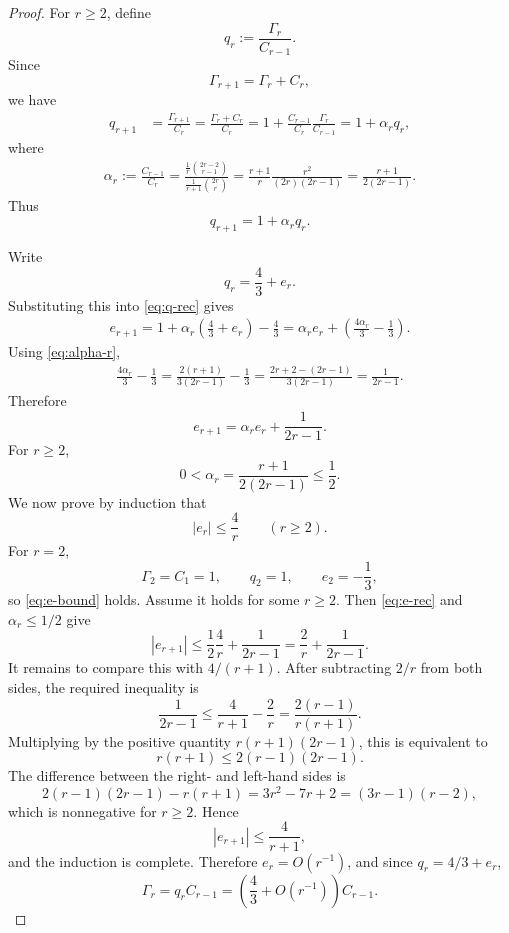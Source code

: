 \documentclass[10pt,a4paper]{amsart}
\theoremstyle{plain}
\begin{document}
\begin{proof}
For $r\ge2$, define
\[
 q_r:=\frac{\Gamma_r}{C_{r-1}}.
\]
Since
\[
 \Gamma_{r+1}=\Gamma_r+C_r,
\]
we have
\begin{align*}
 q_{r+1}
 &=\frac{\Gamma_{r+1}}{C_r}
 =\frac{\Gamma_r+C_r}{C_r}
 =1+\frac{C_{r-1}}{C_r}\frac{\Gamma_r}{C_{r-1}}=1+\alpha_r q_r,
\end{align*}
where
\begin{align}
 \alpha_r
 :=\frac{C_{r-1}}{C_r}
 =\frac{\frac1r\binom{2r-2}{r-1}}
         {\frac1{r+1}\binom{2r}{r}}
 =\frac{r+1}{r}\frac{r^2}{(2r)(2r-1)}
 =\frac{r+1}{2(2r-1)}.
 \label{eq:alpha-r}
\end{align}
Thus
\begin{equation}\label{eq:q-rec}
 q_{r+1}=1+\alpha_rq_r.
\end{equation}

Write
\[
 q_r=\frac43+e_r.
\]
Substituting this into \cref{eq:q-rec} gives
\begin{align*}
 e_{r+1}
 =1+\alpha_r\left(\frac43+e_r\right)-\frac43
 =\alpha_re_r+\left(\frac{4\alpha_r}{3}-\frac13\right).
\end{align*}
Using \cref{eq:alpha-r},
\begin{align*}
 \frac{4\alpha_r}{3}-\frac13
 =\frac{2(r+1)}{3(2r-1)}-\frac13
 =\frac{2r+2-(2r-1)}{3(2r-1)}
 =\frac{1}{2r-1}.
\end{align*}
Therefore
\begin{equation}\label{eq:e-rec}
 e_{r+1}=\alpha_re_r+\frac{1}{2r-1}.
\end{equation}
For $r\ge2$,
\[
 0<\alpha_r=\frac{r+1}{2(2r-1)}\le\frac12.
\]
We now prove by induction that
\begin{equation}\label{eq:e-bound}
 |e_r|\le\frac4r\qquad(r\ge2).
\end{equation}
For $r=2$,
\[
 \Gamma_2=C_1=1,
 \qquad
 q_2=1,
 \qquad
 e_2=-\frac13,
\]
so \cref{eq:e-bound} holds.  Assume it holds for some $r\ge2$.  Then
\cref{eq:e-rec} and $\alpha_r\le1/2$ give
\[
 |e_{r+1}|
 \le\frac12\frac4r+\frac{1}{2r-1}
 =\frac2r+\frac{1}{2r-1}.
\]
It remains to compare this with $4/(r+1)$.  After subtracting $2/r$ from
both sides, the required inequality is
\[
 \frac{1}{2r-1}\le\frac4{r+1}-\frac2r
 =\frac{2(r-1)}{r(r+1)}.
\]
Multiplying by the positive quantity $r(r+1)(2r-1)$, this is equivalent to
\[
 r(r+1)\le2(r-1)(2r-1).
\]
The difference between the right- and left-hand sides is
\[
 2(r-1)(2r-1)-r(r+1)
 =3r^2-7r+2
 =(3r-1)(r-2),
\]
which is nonnegative for $r\ge2$.  Hence
\[
 |e_{r+1}|\le\frac4{r+1},
\]
and the induction is complete.  Therefore $e_r=O(r^{-1})$, and since
$q_r=4/3+e_r$,
\[
 \Gamma_r=q_rC_{r-1}
 =\left(\frac43+O(r^{-1})\right)C_{r-1}.
\]
\end{proof}
\end{document}
